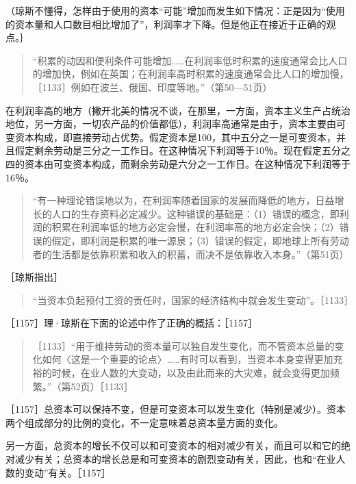 （琼斯不懂得，怎样由于使用的资本“可能”增加而发生如下情况：正是因为“使用的资本量和人口数目相比增加了”，利润率才下降。但是他正在接近于正确的观点。｝

\begin{quote}{“积累的动因和便利条件可能增加……在利润率低时积累的速度通常会比人口的增加快，例如在英国；在利润率高时积累的速度通常会比人口的增加慢，［1133］例如在波兰、俄国、印度等地。”（第50—51页）}\end{quote}

在利润率高的地方（撇开北美的情况不谈，在那里，一方面，资本主义生产占统治地位，另一方面，一切农产品的价值都低），利润率高通常是由于，资本主要由可变资本构成，即直接劳动占优势。假定资本是100，其中五分之一是可变资本，并且假定剩余劳动是三分之一工作日。在这种情况下利润等于10％。现在假定五分之四的资本由可变资本构成，而剩余劳动是六分之一工作日。在这种情况下利润等于16％。

\begin{quote}{“有一种理论错误地以为，在利润率随着国家的发展而降低的地方，日益增长的人口的生存资料必定减少。这种错误的基础是：（1）错误的概念，即利润的积累在利润率低的地方必定会慢，在利润率高的地方必定会快；（2）错误的假定，即利润是积累的唯一源泉；（3）错误的假定，即地球上所有劳动者的生活都是依靠积累和收入的积蓄，而决不是依靠收入本身。”（第51页）}\end{quote}

［琼斯指出］

\begin{quote}{“当资本负起预付工资的责任时，国家的经济结构中就会发生变动”。［1133］}\end{quote}

［1157］理·琼斯在下面的论述中作了正确的概括：［1157］

\begin{quote}{［1133］“用于维持劳动的资本量可以独自发生变化，而不管资本总量的变化如何〈这是一个重要的论点〉……有时可以看到，当资本本身变得更加充裕的时候，在业人数的大变动，以及由此而来的大灾难，就会变得更加频繁。”（第52页）［1133］}\end{quote}

［1157］总资本可以保持不变，但是可变资本可以发生变化（特别是减少）。资本两个组成部分的比例的变化，不一定意味着总资本量方面的变化。

另一方面，总资本的增长不仅可以和可变资本的相对减少有关，而且可以和它的绝对减少有关；总资本的增长总是和可变资本的剧烈变动有关，因此，也和“在业人数的变动”有关。［1157］

